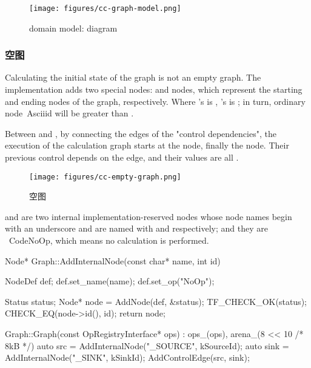 \begin{content}
\begin{figure}[H]
\centering
\texttt{[image: figures/cc-graph-model.png]}
\caption{domain model: diagram}
 \label{fig:cc-graph-model}
\end{figure}

\subsubsection{空图}

Calculating the initial state of the graph is not an empty graph. The implementation adds two special nodes:  and  nodes, which represent the starting and ending nodes of the  graph, respectively. Where 's  is , 's  is ; in turn, ordinary node\ Ascii{id} will be greater than .

Between  and , by connecting the edges of the "control dependencies", the execution of the calculation graph starts at the  node, finally the  node. Their previous control depends on the edge, and their  values ​​are all .

\begin{figure}[H]
\centering
\texttt{[image: figures/cc-empty-graph.png]}
\caption{空图}
 \label{fig:cc-empty-graph}
\end{figure}

 and  are two internal implementation-reserved nodes whose node names begin with an underscore and are named with  and  respectively; and they are \ Code{NoOp}, which means no calculation is performed.

\begin{leftbar}
\begin{c++}
Node* Graph::AddInternalNode(const char* name, int id) {
  NodeDef def;
  def.set_name(name);
  def.set_op("NoOp");

  Status status;
  Node* node = AddNode(def, &status);
  TF_CHECK_OK(status);
  CHECK_EQ(node->id(), id);
  return node;
}

Graph::Graph(const OpRegistryInterface* ops)
    : ops_(ops), arena_(8 << 10 /* 8kB */) {
  auto src  = AddInternalNode("_SOURCE", kSourceId);
  auto sink = AddInternalNode("_SINK",   kSinkId);
  AddControlEdge(src, sink);
}
\end{c++}
\end{leftbar}


\end{content}

